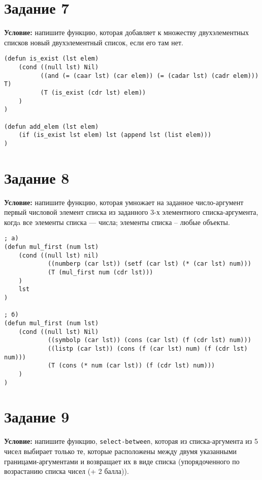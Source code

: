 \section{Задание 7}

\textbf{Условие:} напишите функцию, которая добавляет к множеству двухэлементных списков новый двухэлементный список, если его там нет.

\begin{lstlisting}
(defun is_exist (lst elem)
    (cond ((null lst) Nil)
          ((and (= (caar lst) (car elem)) (= (cadar lst) (cadr elem))) T)
          (T (is_exist (cdr lst) elem))
    )
)

(defun add_elem (lst elem)
    (if (is_exist lst elem) lst (append lst (list elem)))
)   
\end{lstlisting}


\section{Задание 8}

\textbf{Условие:} напишите функцию, которая умножает на заданное число-аргумент первый числовой элемент списка из заданного 3-х элементного списка-аргумента, когдa все элементы списка --- числа; элементы списка -- любые объекты.


\begin{lstlisting}
; a)
(defun mul_first (num lst)
    (cond ((null lst) nil)
            ((numberp (car lst)) (setf (car lst) (* (car lst) num)))
            (T (mul_first num (cdr lst)))
    )
    lst
)

; б)
(defun mul_first (num lst)
    (cond ((null lst) Nil)
            ((symbolp (car lst)) (cons (car lst) (f (cdr lst) num)))
            ((listp (car lst)) (cons (f (car lst) num) (f (cdr lst) num)))
            (T (cons (* num (car lst)) (f (cdr lst) num))) 
    )
)   
\end{lstlisting}


\section{Задание 9}

\textbf{Условие:} напишите функцию, \texttt{select-between}, которая из списка-аргумента из 5 чисел выбирает только те, которые расположены между двумя указанными границами-аргументами и возвращает их в виде списка (упорядоченного по возрастанию списка чисел (+ 2 балла)).

